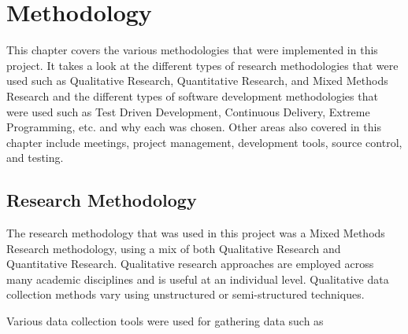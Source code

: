 \chapter{Methodology}
This chapter covers the various methodologies that were implemented in this project. It takes a look at the different types of research methodologies that were used such as Qualitative Research, Quantitative Research, and Mixed Methods Research and the different types of software development methodologies that were used such as Test Driven Development, Continuous Delivery, Extreme Programming, etc. and why each was chosen. Other areas also covered in this chapter include meetings, project management, development tools, source control, and testing.

\section{Research Methodology}
The research methodology that was used in this project was a Mixed Methods Research methodology, using a mix of both Qualitative Research and Quantitative Research. Qualitative research approaches are employed across many academic disciplines and is useful at an individual level. Qualitative data collection methods vary using unstructured or semi-structured techniques.
\par
\medskip
Various data collection tools were used for gathering data such as

